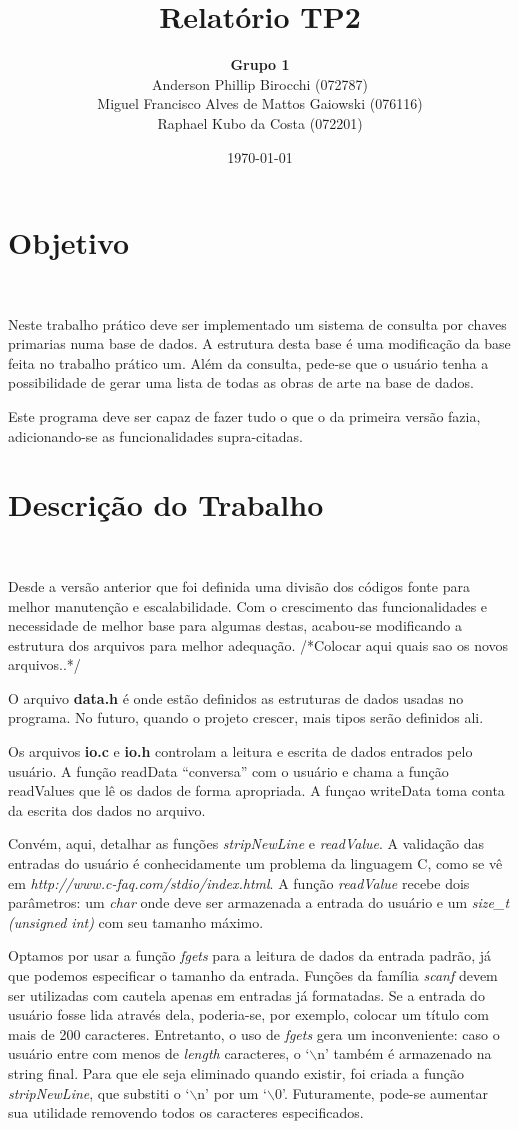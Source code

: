 \documentclass{article}
\title{\textbf{Relatório TP2}}
\author{\textbf{Grupo 1} \\
  Anderson Phillip Birocchi (072787) \\
  Miguel Francisco Alves de Mattos Gaiowski (076116) \\
  Raphael Kubo da Costa (072201)}
\date{\today}
\begin{document}
\maketitle

\section*{Objetivo}\

Neste trabalho prático deve ser implementado um sistema de consulta por chaves primarias numa base de dados. A estrutura desta base é uma modificação da base feita no trabalho prático um. Além da consulta, pede-se que o usuário tenha a possibilidade de gerar uma lista de todas as obras de arte na base de dados.

Este programa deve ser capaz de fazer tudo o que o da primeira versão fazia, adicionando-se as funcionalidades supra-citadas.

\section*{Descrição do Trabalho}\

Desde a versão anterior que foi definida uma divisão dos códigos fonte para melhor manutenção e escalabilidade. Com o crescimento das funcionalidades e necessidade de melhor base para algumas destas, acabou-se modificando a estrutura dos arquivos para melhor adequação. /*Colocar aqui quais sao os novos arquivos..*/

O arquivo \textbf{data.h} é onde estão definidos as estruturas de dados usadas no programa. No futuro, quando o projeto crescer, mais tipos serão definidos ali.

Os arquivos \textbf{io.c} e \textbf{io.h} controlam a leitura e escrita de dados entrados pelo usuário. A função readData ``conversa'' com o usuário e chama a função readValues que lê os dados de forma apropriada. A funçao writeData toma conta da escrita dos dados no arquivo.

Convém, aqui, detalhar as funções \textit{stripNewLine} e \textit{readValue}. A validação das entradas do usuário é conhecidamente um problema da linguagem C, como se vê em \textit{http://www.c-faq.com/stdio/index.html}. A função \textit{readValue} recebe dois parâmetros: um \textit{char} onde deve ser armazenada a entrada do usuário e um \textit{size\_t (unsigned int)} com seu tamanho máximo.

Optamos por usar a função \textit{fgets} para a leitura de dados da entrada padrão, já que podemos especificar o tamanho da entrada. Funções da família \textit{scanf} devem ser utilizadas com cautela apenas em entradas já formatadas. Se a entrada do usuário fosse lida através dela, poderia-se, por exemplo, colocar um título com mais de 200 caracteres. Entretanto, o uso de \textit{fgets} gera um inconveniente: caso o usuário entre com menos de \textit{length} caracteres, o `$\backslash$n' também é armazenado na string final. Para que ele seja eliminado quando existir, foi criada a função \textit{stripNewLine}, que substiti o `$\backslash$n' por um `$\backslash$0'. Futuramente, pode-se aumentar sua utilidade removendo todos os caracteres especificados.
\end{document}
